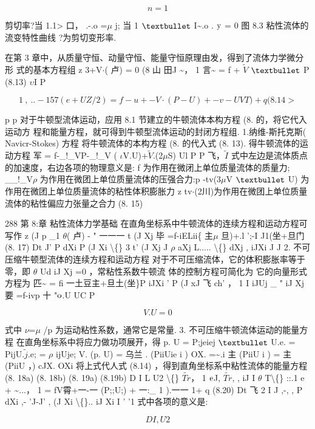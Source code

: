 \[n=1\]

剪切率?当 1.1> 口， .-.o =$\mu$ j; 当 1 ${\rm •}$ I\textasciitilde{}.o . ${\rm y}$ = 0 图 8.3 粘性流体的流变特性曲线 ?为剪切变形率.

在第 3 章中，从质量守恒、动量守恒、能量守恒原理由发，得到了流体力学微分形 式的基本方程组 z 3+V$\cdot $( 卢) = 0 (8 山 田J \textasciitilde{}， 1 言\textasciitilde{} = f + $\tilde{V}$ ${\rm •}$ P (8.13) $\upsilon$I P

\[1 ~ , ~..- 1 57(e+UZ/2)=f-u+-V\cdot (P-U)+-v-UVT)+q(8.14 >\]

p p 对于牛顿型流体运动，应用 8.1 节建立的牛顿流体本构方程 (8. 的，将它代入运动方 程和能量方程，就可得到牛顿型流体运动的封闭方程组. 1.纳维-斯托克斯( Navicr-Stokes) 方程 将牛顿流体的本构方程 (8. 的代入式 (8. 13). 得牛顿流体的运动方程 军 = f-\_!\_VP-\_!\_V ( $\iota$V.U)+$\tilde{V}$.(2$\mu$S) Ul P P 飞，$\tilde{I}$ 式中左边是流体质点的加速度，右边各项的物理意义是: f 为作用在微闭上单位质量流体的质量力; \_\_!\_V$\rho$ 为作用在微团上单位质量流体的压强合力:p -tv(3$\mu$V ${\rm •}$ U) 为作用在微团上单位质量流体的粘性体积膨胀力 z tv$\cdot $(2川)为作用在微团上单位质量流体的粘性偏应力张量之合力 (8. 15)

288 第 8:章 粘性流体力学基础 在直角坐标系中牛顿流体的连续方程和运动方程可写作 z (J p \_1 $\theta$( 卢) - " 一一一  t (J Xj 毕 =f-iELii\{ 主$\mu$ 旦)+.l ';-I J1(坐+旦门 (8. 17) Dt J' P dXi P (J Xi \textbackslash\{\} 3 t' (J Xj J $\rho$ aXj L..... \textbackslash\{\} dXj , iJXi J J 2. 不可压缩牛顿型流体的连续方程和运动方程 对于不可压缩流体，它的体积膨胀率等于零，即 $\theta$ Ud iJ Xj =0 ，常粘性系数牛顿流 体的控制方程可简化为 它的向量形式方程为 匹\textasciitilde{} = fi 一土豆主+旦土(坐\}P iJXi ' P (J xJ 飞 ch' ， 1 I iJUj \_ " iJ Xj 要 =f-ivp 十 "${\rm o}$.U UC P

\[V. U = 0\]

式中 $\nu$=$\mu$ /p 为运动粘性系数，通常它是常量. 3. 不可压缩牛顿流体运动的能量方程 在直角坐标系中将应力做功项展开，得 p. U = P;jeiej ${\rm •}$ U.e. = PijU.$\tilde{j}$.e; = $\rho$ ijUje; V. (p. U) = 乌兰 . (PiiUie i ) OX. =\textasciitilde{}.i 主 (PiiU i ) = 主 (PiiU ，) cJX. OXi 将上式代人式 (8.14) ，得到直角坐标系中粘性流体的能量方程 (8. 18a) (8. 18b) (8. 19a) (8.19b) D I L U2 \textbackslash\{\} $\tilde{Tr}$， 1 ${\rm e}$J, $\tilde{Tr}$, , iJ I $\theta$ T\textbackslash\{\} ::.1 e + \textasciitilde{}...， 1 = fV霄+一-一 (P;;U;) + 一:\_ 1 ).一一 1+ q (8.20) Dt 飞 2 I J ,-, , P dXi ,- 'J-J' , (J Xi \textbackslash\{\}.. iJ Xi I ' '1 式中各项的意义是:

\[D I , U2  \]

